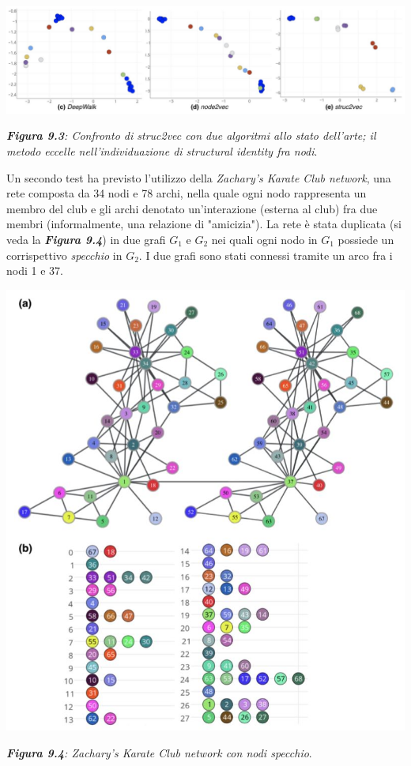 \documentclass[11pt]{article}
\begin{document}
\begin{center}
\includegraphics[scale=0.4]{struc2}

\begin{small}\textit{\textbf{Figura 9.3}: Confronto di struc2vec con due algoritmi allo stato dell'arte; il metodo eccelle nell'individuazione di structural identity fra nodi}.\end{small}
\end{center}

Un secondo test ha previsto l'utilizzo della \textit{Zachary's Karate Club network}, una rete composta da 34 nodi e 78 archi, nella quale ogni nodo rappresenta un membro del club e gli archi denotato un'interazione (esterna al club) fra due membri (informalmente, una relazione di "amicizia"). La rete è stata duplicata (si veda la \textit{\textbf{Figura 9.4}}) in due grafi $G_1$ e $G_2$ nei quali ogni nodo in $G_1$ possiede un corrispettivo \textit{specchio} in $G_2$. I due grafi sono stati connessi tramite un arco fra i nodi 1 e 37.
 
\begin{center}
\includegraphics[scale=0.56]{struc4}

\begin{small}\textit{\textbf{Figura 9.4}: Zachary's Karate Club network con nodi specchio}.\end{small}
\end{center}
\end{document}
